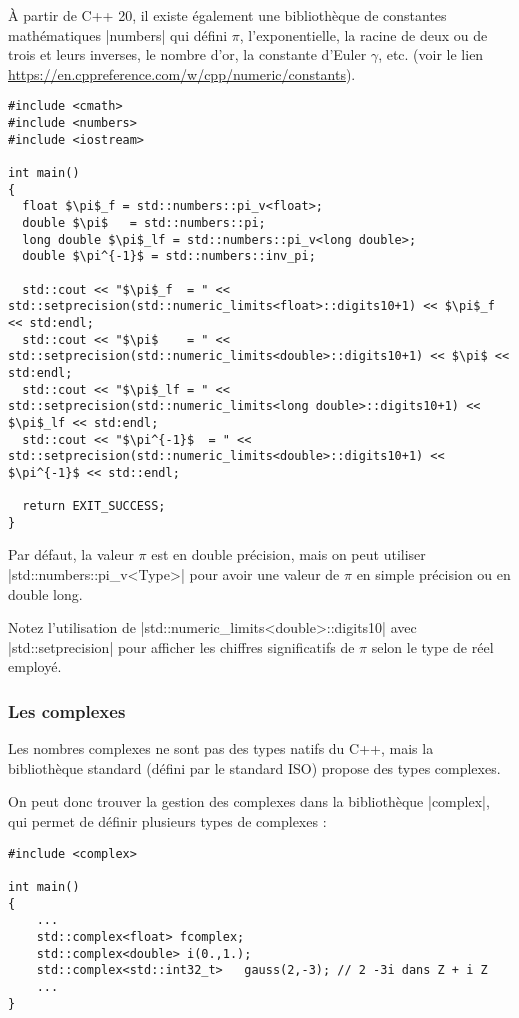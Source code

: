 À partir de C++ 20, il existe également une bibliothèque de constantes mathématiques |numbers| qui défini $\pi$, l'exponentielle, la racine de deux ou de trois et leurs inverses, le nombre d'or, la constante d'Euler $\gamma$, etc. (voir le lien  \url{https://en.cppreference.com/w/cpp/numeric/constants}).


\begin{lstlisting}[caption=Exemple d'utilisation des constantes en C++ 20,mathescape=true]
#include <cmath>
#include <numbers>
#include <iostream>

int main()
{
  float $\pi$_f = std::numbers::pi_v<float>;
  double $\pi$   = std::numbers::pi;
  long double $\pi$_lf = std::numbers::pi_v<long double>;
  double $\pi^{-1}$ = std::numbers::inv_pi;

  std::cout << "$\pi$_f  = " << std::setprecision(std::numeric_limits<float>::digits10+1) << $\pi$_f << std:endl;
  std::cout << "$\pi$    = " << std::setprecision(std::numeric_limits<double>::digits10+1) << $\pi$ << std:endl;
  std::cout << "$\pi$_lf = " << std::setprecision(std::numeric_limits<long double>::digits10+1) << $\pi$_lf << std:endl;
  std::cout << "$\pi^{-1}$  = " << std::setprecision(std::numeric_limits<double>::digits10+1) << $\pi^{-1}$ << std::endl;

  return EXIT_SUCCESS;
}
\end{lstlisting}

Par défaut, la valeur $\pi$ est en double précision, mais on peut utiliser |std::numbers::pi_v<Type>| pour avoir une valeur de $\pi$ en simple précision ou en double long.

Notez l'utilisation de |std::numeric_limits<double>::digits10| avec |std::setprecision| pour afficher les chiffres
significatifs de $\pi$ selon le type de réel employé.

\subsubsection{Les complexes}

Les nombres complexes ne sont pas des types natifs du C++, mais la bibliothèque standard (défini par le standard ISO) propose des types complexes.

On peut donc trouver la gestion des complexes dans la bibliothèque |complex|, qui permet de définir plusieurs types de complexes :
\begin{lstlisting}[caption=Exemple de déclaration et de définition de nombres complexes]
#include <complex>

int main()
{
    ...
    std::complex<float> fcomplex;
    std::complex<double> i(0.,1.);
    std::complex<std::int32_t>   gauss(2,-3); // 2 -3i dans Z + i Z
    ...
}
\end{lstlisting}

